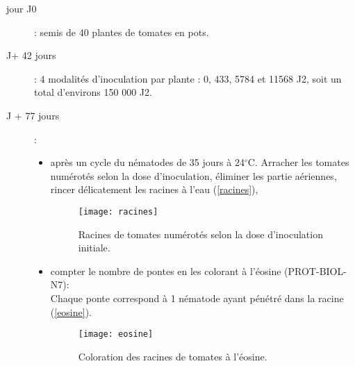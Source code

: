 \begin{description}
\item[jour J0] : semis de 40 plantes de tomates en pots.

\item[J+ 42 jours] : 4 modalités d'inoculation par plante : 0, 433, 5784 et 11568 J2, soit un total d'environs 150 000 J2.

\item[J + 77 jours] :
	{\small \begin{itemize}[itemsep=15pt, topsep=5pt]
	\item après un cycle du nématodes de 35 jours à 24$^{\circ}$C. Arracher les tomates numérotés selon la dose 
	      d'inoculation, éliminer les partie aériennes, rincer délicatement les racines à l'eau (\autoref{racines}),\\
		\begin{minipage}[c]{0.70 \textwidth}
				\begin{figure}[H]     
				\centering \texttt{[image: racines]}
				\caption{ Racines de tomates numérotés selon la dose d'inoculation initiale.}
				\label{racines}
				\end{figure}
		\end{minipage}
	\item compter le nombre de pontes en les colorant à l’éosine (PROT-BIOL-N7): \\
	      Chaque ponte correspond à 1 nématode ayant pénétré dans la racine (\autoref{eosine}). 
		   \begin{minipage}[c]{0.70 \textwidth}
			   \begin{figure}[H]     
			   \centering \texttt{[image: eosine]}
			   \caption{ Coloration des  racines de tomates à l’éosine.}
			   \label{eosine}
			   \end{figure}
		\end{minipage}
	\end{itemize}}

\end{description}



\iffalse


\fi
	
